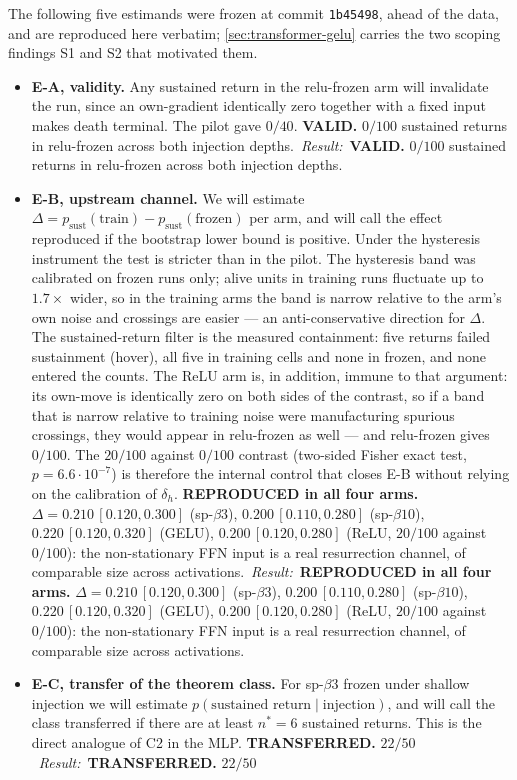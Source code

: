 \documentclass[11pt]{article}
\makeatletter
\theoremstyle{definition}
\theoremstyle{remark}
\newcommand{\@eresempty}{}
\newcommand{\eresult}[1]{%
  \def\@erestmp{#1}%
  \ifx\@erestmp\@eresempty\else\ \textit{Result:}~#1\fi}
\makeatother
\begin{document}
The following five estimands were frozen at commit \texttt{1b45498}, ahead of the
data, and are reproduced here verbatim; \cref{sec:transformer-gelu} carries the
two scoping findings S1 and S2 that motivated them.

\begin{itemize}
\item \textbf{E-A, validity.} Any sustained return in the relu-frozen arm will
invalidate the run, since an own-gradient identically zero together with a fixed
input makes death terminal. The pilot gave $0/40$.\eresult{\textbf{VALID.}
$0/100$ sustained returns in relu-frozen across both injection depths.}
\item \textbf{E-B, upstream channel.} We will estimate
$\Delta=p_{\mathrm{sust}}(\text{train})-p_{\mathrm{sust}}(\text{frozen})$ per
arm, and will call the effect reproduced if the bootstrap lower bound is
positive. Under the hysteresis instrument the test is stricter than in the
pilot. The hysteresis band was calibrated on frozen runs only; alive units in
training runs fluctuate up to $1.7\times$ wider, so in the training arms the
band is narrow relative to the arm's own noise and crossings are easier --- an
anti-conservative direction for $\Delta$. The sustained-return filter is the
measured containment: five returns failed sustainment (hover), all five in
training cells and none in frozen, and none entered the counts. The ReLU arm
is, in addition, immune to that argument: its own-move is identically zero on
both sides of the contrast, so if a band that is narrow relative to training
noise were manufacturing spurious crossings, they would appear in relu-frozen
as well --- and relu-frozen gives $0/100$. The $20/100$ against $0/100$
contrast (two-sided Fisher exact test, $p=6.6\cdot10^{-7}$) is therefore the
internal control that closes E-B without relying on the calibration of
$\delta_h$.\eresult{\textbf{REPRODUCED in all four arms.}
$\Delta=0.210\,[0.120,0.300]$
(sp-$\beta3$), $0.200\,[0.110,0.280]$ (sp-$\beta10$),
$0.220\,[0.120,0.320]$ (GELU), $0.200\,[0.120,0.280]$ (ReLU, $20/100$
against $0/100$): the non-stationary FFN input is a real resurrection channel,
of comparable size across activations.}
\item \textbf{E-C, transfer of the theorem class.} For sp-$\beta3$ frozen under
shallow injection we will estimate
$p(\text{sustained return}\mid\text{injection})$, and will call the class
transferred if there are at least $n^\ast=6$ sustained returns. This is the
direct analogue of C2 in the MLP.\eresult{\textbf{TRANSFERRED.} $22/50$
}
\end{itemize}
\end{document}
